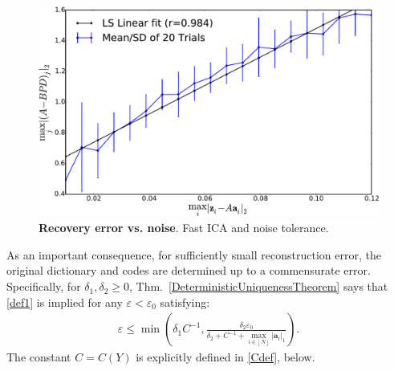 \documentclass[journal, twocolumn]{IEEEtran}
\newtheorem{remark}{Remark}
\begin{document}
\begin{figure}[b!]
\begin{center}
\includegraphics[width=\linewidth]{figs/robust_error.pdf}
\caption{\textbf{Recovery error vs. noise}.  Fast ICA \cite{hyvarinen1999fast} and noise tolerance.}\label{ica_robust}
\end{center}
\end{figure}






As an important consequence, for sufficiently small reconstruction error, the original dictionary and codes are determined up to a commensurate error. Specifically, for $\delta_1, \delta_2 \geq 0$, Thm.~\ref{DeterministicUniquenessTheorem} says that \eqref{def1} is implied for any $\varepsilon < \varepsilon_0$ satisfying:
\begin{align*}
\varepsilon \leq \min \left( \delta_1 C^{-1}, \frac{ \delta_2 \varepsilon_0}{\delta_2 + C^{-1} + \max_{i \in [N]} |\mathbf{a}_i|_1} \right).
\end{align*}
The constant $C = C(Y)$ is explicitly defined in \eqref{Cdef}, below. 
\end{document}
